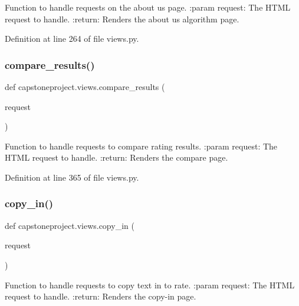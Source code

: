 \begin{DoxyVerb}Function to handle requests on the about us page.
:param request: The HTML request to handle.
:return: Renders the about us algorithm page.
\end{DoxyVerb}
 

Definition at line 264 of file views.\+py.

\mbox{\label{namespacecapstoneproject_1_1views_adcc34573c7064f83eb5e310efbb2c0c4}} 
\subsubsection{\texorpdfstring{compare\+\_\+results()}{compare\_results()}}
{\footnotesize\ttfamily def capstoneproject.\+views.\+compare\+\_\+results (\begin{DoxyParamCaption}\item[{}]{request }\end{DoxyParamCaption})}

\begin{DoxyVerb}Function to handle requests to compare rating results.
:param request: The HTML request to handle.
:return: Renders the compare page.
\end{DoxyVerb}
 

Definition at line 365 of file views.\+py.

\mbox{\label{namespacecapstoneproject_1_1views_aa623cff0d3f233b251fbbcc14e8aa86f}} 
\subsubsection{\texorpdfstring{copy\+\_\+in()}{copy\_in()}}
{\footnotesize\ttfamily def capstoneproject.\+views.\+copy\+\_\+in (\begin{DoxyParamCaption}\item[{}]{request }\end{DoxyParamCaption})}

\begin{DoxyVerb}Function to handle requests to copy text in to rate.
:param request: The HTML request to handle.
:return: Renders the copy-in page.
\end{DoxyVerb}
 

